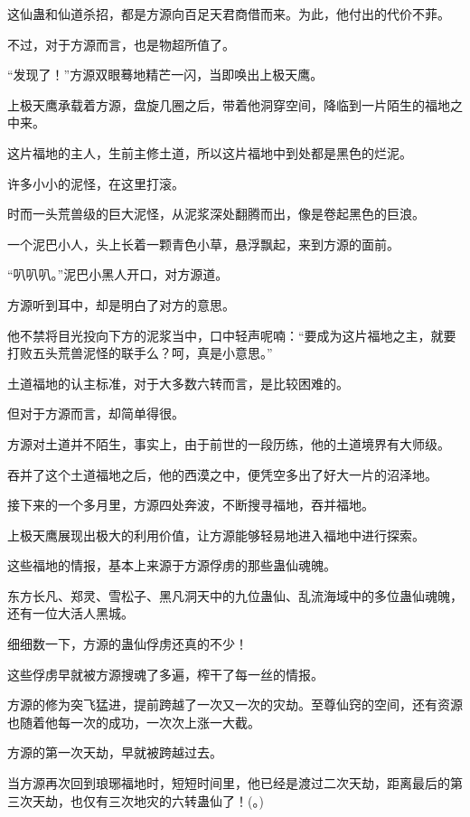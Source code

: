 \begin{this_body}
这仙蛊和仙道杀招，都是方源向百足天君商借而来。为此，他付出的代价不菲。

不过，对于方源而言，也是物超所值了。

“发现了！”方源双眼蓦地精芒一闪，当即唤出上极天鹰。

上极天鹰承载着方源，盘旋几圈之后，带着他洞穿空间，降临到一片陌生的福地之中来。

这片福地的主人，生前主修土道，所以这片福地中到处都是黑色的烂泥。

许多小小的泥怪，在这里打滚。

时而一头荒兽级的巨大泥怪，从泥浆深处翻腾而出，像是卷起黑色的巨浪。

一个泥巴小人，头上长着一颗青色小草，悬浮飘起，来到方源的面前。

“叭叭叭。”泥巴小黑人开口，对方源道。

方源听到耳中，却是明白了对方的意思。

他不禁将目光投向下方的泥浆当中，口中轻声呢喃：“要成为这片福地之主，就要打败五头荒兽泥怪的联手么？呵，真是小意思。”

土道福地的认主标准，对于大多数六转而言，是比较困难的。

但对于方源而言，却简单得很。

方源对土道并不陌生，事实上，由于前世的一段历练，他的土道境界有大师级。

吞并了这个土道福地之后，他的西漠之中，便凭空多出了好大一片的沼泽地。

接下来的一个多月里，方源四处奔波，不断搜寻福地，吞并福地。

上极天鹰展现出极大的利用价值，让方源能够轻易地进入福地中进行探索。

这些福地的情报，基本上来源于方源俘虏的那些蛊仙魂魄。

东方长凡、郑灵、雪松子、黑凡洞天中的九位蛊仙、乱流海域中的多位蛊仙魂魄，还有一位大活人黑城。

细细数一下，方源的蛊仙俘虏还真的不少！

这些俘虏早就被方源搜魂了多遍，榨干了每一丝的情报。

方源的修为突飞猛进，提前跨越了一次又一次的灾劫。至尊仙窍的空间，还有资源也随着他每一次的成功，一次次上涨一大截。

方源的第一次天劫，早就被跨越过去。

当方源再次回到琅琊福地时，短短时间里，他已经是渡过二次天劫，距离最后的第三次天劫，也仅有三次地灾的六转蛊仙了！(。)

\end{this_body}
